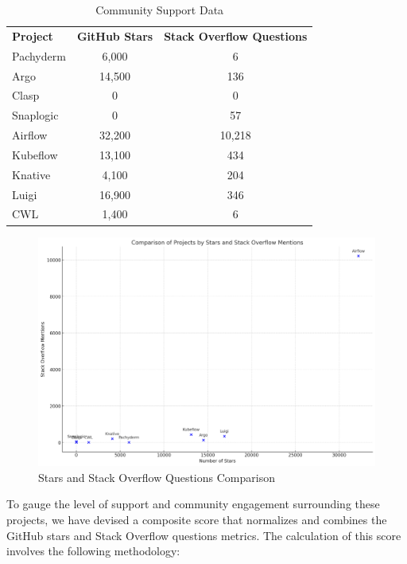 \begin{table}[htb]
    \centering
    \caption[Community Support Data]{Community Support Data\footnotemark}
    \label{tab:community_support} 
    \begin{tabular}{|l|c|c|} 
      \textbf{Project} & \textbf{GitHub Stars} & \textbf{Stack Overflow Questions} \\ 
      Pachyderm  & 6,000   & 6          \\ 
      Argo       & 14,500  & 136        \\ 
      Clasp      & 0       & 0          \\ 
      Snaplogic  & 0       & 57         \\ 
      Airflow    & 32,200  & 10,218     \\ 
      Kubeflow   & 13,100  & 434        \\ 
      Knative    & 4,100   & 204        \\ 
      Luigi      & 16,900  & 346        \\ 
      CWL        & 1,400   & 6          \\ 
   \end{tabular}
\end{table}

\begin{figure}[htb]
    \centering
    \includegraphics[width=12cm]{graphics/Stars_stackoverflow_comparison.png}
    \caption[Stars and Stack overflow Questions Comparison]{Stars and Stack Overflow Questions Comparison}
    \label{abb:stars_stackoverflow_comparison}
\end{figure}

To gauge the level of support and community engagement surrounding these projects, we have devised a composite score that normalizes and combines the GitHub stars and Stack Overflow questions metrics. The calculation of this score involves the following methodology:

